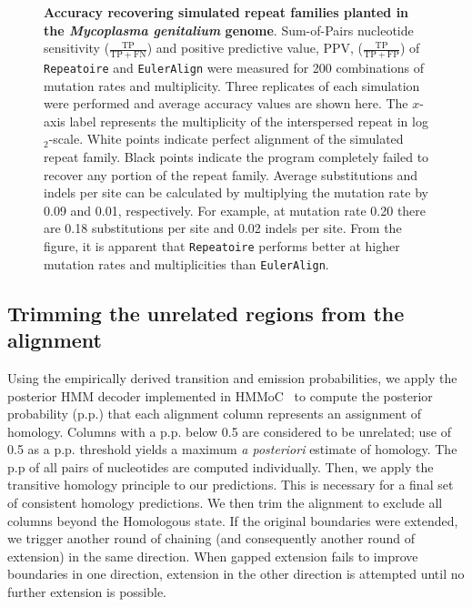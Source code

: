 \documentclass[12pt,journal,letterpaper,onecolumn, draftcls]{IEEEtran}
\begin{document}
\begin{figure*}[th!]
\centering {}
\caption[Accuracy recovering simulated repeat families planted in the
\textit{Mycoplasma genitalium} genome]%
{\textbf{Accuracy recovering simulated repeat families planted in the
\textit{Mycoplasma genitalium} genome}.  Sum-of-Pairs nucleotide
sensitivity ($\frac{\mathrm{TP}}{\mathrm{TP} + \mathrm{FN}}$) and positive predictive value, PPV, ($\frac{\mathrm{TP}}{\mathrm{TP} +
\mathrm{FP}}$) of \texttt{Repeatoire}
and \texttt{EulerAlign} were measured for 200
combinations of mutation rates and multiplicity.  Three replicates of
each simulation were performed and average accuracy values are shown
here.  The $x$-axis label represents the multiplicity of the interspersed repeat in log$_2$-scale. White points indicate perfect alignment of the simulated repeat
family.  Black points indicate the program completely failed to
recover any portion of the repeat family.  Average substitutions and indels per site can be
calculated by multiplying the mutation rate by 0.09 and 0.01, respectively.  For example, at mutation rate 0.20
there are 0.18 substitutions per site and 0.02 indels per site.  From
the figure, it is apparent that \texttt{Repeatoire} performs better
at higher mutation rates and multiplicities than \texttt{EulerAlign}.}
\label{fig-results}
\end{figure*}


\subsection{Trimming the unrelated regions from the alignment}
Using the empirically derived transition and emission probabilities,
we apply the posterior HMM decoder implemented in HMMoC~\cite{Lunter2007} to compute the posterior probability (p.p.) that
each alignment column represents an assignment of homology.  Columns with a
p.p. below 0.5 are considered to be unrelated; use of 0.5 as a p.p. threshold
yields a maximum \textit{a posteriori} estimate of homology.  The p.p of all pairs of nucleotides are
computed individually. Then, we apply the
transitive homology principle to our predictions. This
is necessary for a final
set of consistent homology predictions.  We then trim the alignment to exclude all
columns beyond the Homologous state. If the original boundaries were
extended, we trigger another round of chaining (and consequently
another round of extension) in the same direction.
When gapped extension fails to improve boundaries
in one direction, extension in the other direction is attempted until
no further extension is possible.
\end{document}

